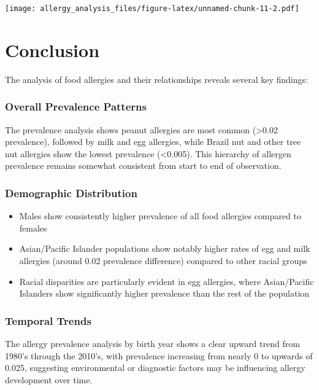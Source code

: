 \documentclass[
]{article}
\providecommand{\tightlist}{%
  \setlength{\itemsep}{0pt}\setlength{\parskip}{0pt}}
\begin{document}
\texttt{[image: allergy\_analysis\_files/figure-latex/unnamed-chunk-11-2.pdf]}

\section{Conclusion}\label{conclusion}

The analysis of food allergies and their relationships reveals several
key findings:

\subsubsection{Overall Prevalence
Patterns}\label{overall-prevalence-patterns}

The prevalence analysis shows peanut allergies are most common
(\textgreater0.02 prevalence), followed by milk and egg allergies, while
Brazil nut and other tree nut allergies show the lowest prevalence
(\textless0.005). This hierarchy of allergen prevalence remains somewhat
consistent from start to end of observation.

\subsubsection{Demographic Distribution}\label{demographic-distribution}

\begin{itemize}
\tightlist
\item
  Males show consistently higher prevalence of all food allergies
  compared to females
\item
  Asian/Pacific Islander populations show notably higher rates of egg
  and milk allergies (around 0.02 prevalence difference) compared to
  other racial groups
\item
  Racial disparities are particularly evident in egg allergies, where
  Asian/Pacific Islanders show significantly higher prevalence than the
  rest of the population
\end{itemize}

\subsubsection{Temporal Trends}\label{temporal-trends}

The allergy prevalence analysis by birth year shows a clear upward trend
from 1980's through the 2010's, with prevalence increasing from nearly 0
to upwards of 0.025, suggesting environmental or diagnostic factors may
be influencing allergy development over time.
\end{document}
